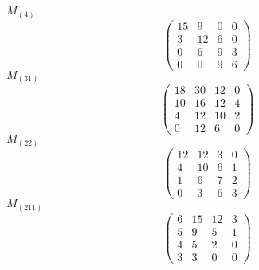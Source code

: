 \documentclass[12pt,reqno]{amsart}
\begin{document}
\Large
$M_{(4)}$                             $$ \begin{pmatrix} 
                          15 & 9 & 0 & 0 \\[6pt]
                          3 & 12 & 6 & 0 \\[6pt]
                           0 & 6 & 9 & 3 \\[6pt]
                             0 & 0 & 9 & 6
                              \end{pmatrix} $$ 
$M_{(31)}$                             $$ \begin{pmatrix} 
                         18 & 30 & 12 & 0 \\[6pt]
                         10 & 16 & 12 & 4 \\[6pt]
                          4 & 12 & 10 & 2 \\[6pt]
                            0 & 12 & 6 & 0
                              \end{pmatrix} $$ 
$M_{(22)}$                             $$ \begin{pmatrix} 
                          12 & 12 & 3 & 0 \\[6pt]
                          4 & 10 & 6 & 1 \\[6pt]
                           1 & 6 & 7 & 2 \\[6pt]
                             0 & 3 & 6 & 3
                              \end{pmatrix} $$ 
$M_{(211)}$                             $$ \begin{pmatrix} 
                          6 & 15 & 12 & 3 \\[6pt]
                           5 & 9 & 5 & 1 \\[6pt]
                           4 & 5 & 2 & 0 \\[6pt]
                             3 & 3 & 0 & 0
                              \end{pmatrix} $$ 
\end{document}
